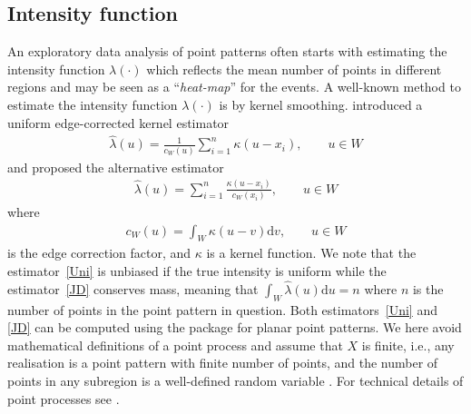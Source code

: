 \documentclass[article]{jss}
\newcommand{\de}{\mathrm{d}}
\begin{document}
\subsection{Intensity function}\label{sec:intensity}
  An exploratory data analysis of point patterns often starts with estimating the intensity function $\lambda(\cdot)$ which reflects the mean number of points in different regions and may be seen as a ``\textit{heat-map}'' for the events. A well-known method to estimate the intensity function $\lambda(\cdot)$ is by kernel smoothing. \cite{D85} introduced a uniform edge-corrected kernel estimator
  \begin{eqnarray}\label{Uni}
  \widehat{\lambda}(u)=\frac{1}{c_W(u)}\sum\limits_{i=1}^{n} \kappa(u-x_i), \qquad u \in W
  \end{eqnarray}
  and \cite{jones93} proposed the alternative estimator
  \begin{eqnarray}\label{JD}
  \widehat{\lambda}(u)=\sum\limits_{i=1}^{n} \frac{\kappa(u-x_i)}{c_W(x_i)}, \qquad u \in W 
  \end{eqnarray}
  where
  \begin{eqnarray}
  c_W(u)=\int_W \kappa(u-v) \de v, \qquad u \in W
  \end{eqnarray}
  is the edge correction factor, and $\kappa$ is a kernel function. We note that the estimator~\ref{Uni} is unbiased if the true intensity is uniform while the estimator~\ref{JD} conserves mass, meaning that $\int_W \widehat{\lambda}(u) \de u =n$ where $n$ is the number of points in the point pattern in question. Both estimators~\ref{Uni} and \ref{JD} can be computed using the  package  for planar point patterns. We here avoid mathematical definitions of a point process and assume that $X$ is finite, i.e., any realisation is a point pattern with finite number of points, and the number of points in any subregion is a well-defined random variable \citep{BRT15}. For technical details of point processes see \citet{MW03,daley07}.
  
\end{document}
